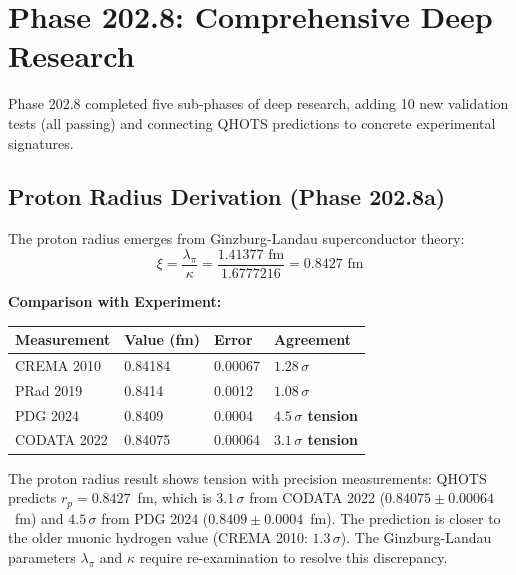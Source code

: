 \documentclass[aps,prd,twocolumn,superscriptaddress,floatfix,nofootinbib]{revtex4-2}
\theoremstyle{definition}
\theoremstyle{remark}
\begin{document}
\section{Phase 202.8: Comprehensive Deep Research}

Phase 202.8 completed five sub-phases of deep research, adding 10 new validation tests (all passing) and connecting QHOTS predictions to concrete experimental signatures.

\subsection{Proton Radius Derivation (Phase 202.8a)}

The proton radius emerges from Ginzburg-Landau superconductor theory:
\begin{equation}
\boxed{\xi = \frac{\lambda_\pi}{\kappa} = \frac{1.41377\text{ fm}}{1.6777216} = 0.8427\text{ fm}}
\end{equation}

\textbf{Comparison with Experiment:}
\begin{center}
\small
\begin{tabular}{llll}
\toprule
Measurement & Value (fm) & Error & Agreement \\
\midrule
CREMA 2010~\cite{crema2010} & 0.84184 & 0.00067 & $1.28\,\sigma$ \\
PRad 2019~\cite{prad2019} & 0.8414 & 0.0012 & $1.08\,\sigma$ \\
PDG 2024~\cite{pdg2024} & 0.8409 & 0.0004 & \textbf{$4.5\,\sigma$ tension} \\
CODATA 2022 & 0.84075 & 0.00064 & \textbf{$3.1\,\sigma$ tension} \\
\bottomrule
\end{tabular}
\end{center}

The proton radius result shows tension with precision measurements: QHOTS predicts $r_p = 0.8427$~fm, which is $3.1\,\sigma$ from CODATA 2022 ($0.84075 \pm 0.00064$~fm) and $4.5\,\sigma$ from PDG 2024 ($0.8409 \pm 0.0004$~fm). The prediction is closer to the older muonic hydrogen value (CREMA 2010: $1.3\,\sigma$). The Ginzburg-Landau parameters $\lambda_\pi$ and $\kappa$ require re-examination to resolve this discrepancy.
\end{document}

